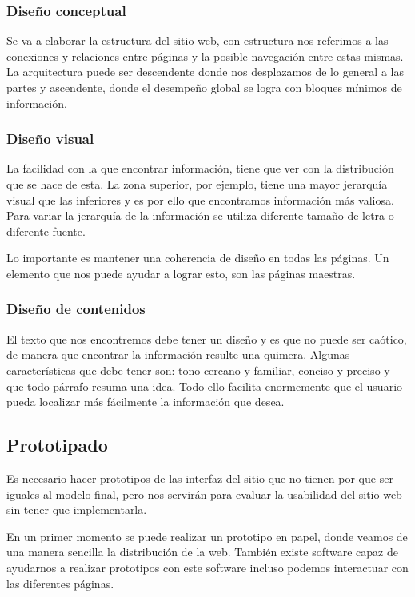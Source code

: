 \subsubsection{Diseño conceptual}
Se va a elaborar la estructura del sitio web, con estructura nos referimos a las conexiones y relaciones entre páginas y la posible navegación entre estas mismas. La arquitectura puede ser descendente donde nos desplazamos de lo general a las partes y ascendente, donde el desempeño global se logra con bloques mínimos de información.

\subsubsection{Diseño visual}
La facilidad con la que encontrar información, tiene que ver con la distribución que se hace de esta. La zona superior, por ejemplo, tiene una mayor jerarquía visual que las inferiores y es por ello que encontramos información más valiosa. Para variar la jerarquía de la información se utiliza diferente tamaño de letra o diferente fuente.

Lo importante es mantener una coherencia de diseño en todas las páginas. Un elemento que nos puede ayudar a lograr esto, son las páginas maestras.

\subsubsection{Diseño de contenidos}
El texto que nos encontremos debe tener un diseño y es que no puede ser caótico, de manera que encontrar la información resulte una quimera. Algunas características que debe tener son: tono cercano y familiar, conciso y preciso y que todo párrafo resuma una idea.
Todo ello facilita enormemente que el usuario pueda localizar más fácilmente la información que desea.

\subsection{Prototipado}
Es necesario hacer prototipos de las interfaz del sitio que no tienen por que ser iguales al modelo final, pero nos servirán para evaluar la usabilidad del  sitio web sin tener que implementarla.

En un primer momento se puede realizar un prototipo en papel, donde veamos de una manera sencilla la distribución de la web. También existe software capaz de ayudarnos a realizar prototipos con este software incluso podemos interactuar con las diferentes páginas.

